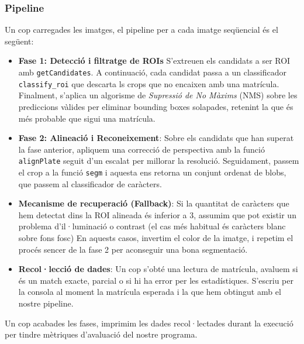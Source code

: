 \subsubsection{Pipeline}
Un cop carregades les imatges, el pipeline per a cada imatge seqüencial és el següent:
\begin{itemize}
    \item \textbf{Fase 1: Detecció i filtratge de ROIs} S'extreuen els candidats a ser ROI amb \texttt{getCandidates}. A continuació, cada candidat passa a un classificador \texttt{classify\_roi} que descarta ls crops que no encaixen amb una matrícula. Finalment, s'aplica un algorisme de \textit{Supressió de No Màxims} (NMS) sobre les prediccions vàlides per eliminar bounding boxes solapades, retenint la que és més probable que sigui una matrícula.

    \item \textbf{Fase 2: Alineació i Reconeixement}: Sobre els candidats que han superat la fase anterior, apliquem una correcció de perspectiva amb la funció \texttt{alignPlate} seguit d'un escalat per millorar la resolució. Seguidament, passem el crop a la funció \texttt{segm} i aquesta ens retorna un conjunt ordenat de blobs, que passem al classificador de caràcters.

    \item \textbf{Mecanisme de recuperació (Fallback)}: Si la quantitat de caràcters que hem detectat dins la ROI alineada és inferior a 3, assumim que pot existir un problema d'il·luminació o contrast (el cas més habitual és caràcters blanc sobre fons fosc) En aquests casos, invertim el color de la imatge, i repetim el procés sencer de la fase 2 per aconseguir una bona segmentació.
    
    \item \textbf{Recol·lecció de dades}: Un cop s'obté una lectura de matrícula, avaluem si és un match exacte, parcial o si hi ha error per les estadístiques. S'escriu per la consola al moment la matrícula esperada i la que hem obtingut amb el nostre pipeline.
\end{itemize}

Un cop acabades les fases, imprimim les dades recol·lectades durant la execució per tindre mètriques d'avaluació del nostre programa.